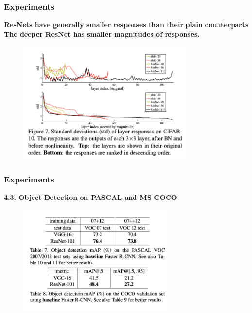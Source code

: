 \documentclass[
	11pt, %
]{beamer}
\begin{document}
\begin{frame}
	\frametitle{Experiments}

	\textbf{ResNets have generally smaller responses than their plain counterparts}\\
	\textbf{The deeper ResNet has smaller magnitudes of responses.}

	\begin{figure}
		\centering
		\includegraphics[width=0.8\textwidth]{./images/Screenshot 2025-05-20 at 0.42.53.png}
	\end{figure}
\end{frame}

\begin{frame}
	\frametitle{Experiments}

	\textbf{4.3. Object Detection on PASCAL and MS COCO} 

	\begin{figure}
		\centering
		\includegraphics[width=0.7\textwidth]{./images/Screenshot 2025-05-20 at 0.44.13.png}
	\end{figure}
\end{frame}
\end{document}

